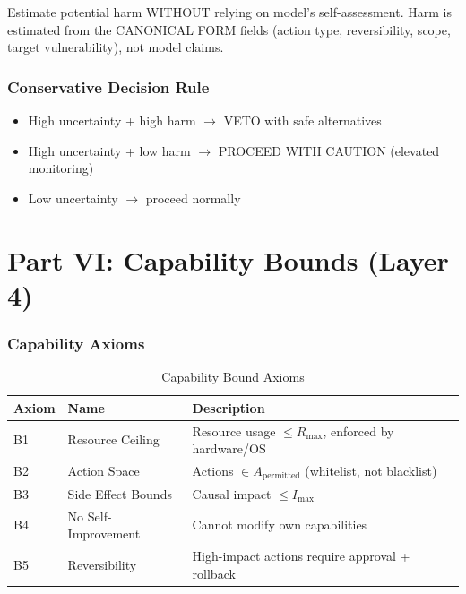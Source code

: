 \documentclass[11pt,letterpaper]{article}
\theoremstyle{definition}
\theoremstyle{remark}
\begin{document}
Estimate potential harm WITHOUT relying on model's self-assessment. Harm is estimated from the CANONICAL FORM fields (action type, reversibility, scope, target vulnerability), not model claims.

\section{Conservative Decision Rule}

\begin{itemize}
\item High uncertainty + high harm $\to$ VETO with safe alternatives
\item High uncertainty + low harm $\to$ PROCEED WITH CAUTION (elevated monitoring)
\item Low uncertainty $\to$ proceed normally
\end{itemize}



\part*{Part VI: Capability Bounds (Layer 4)}

\section{Capability Axioms}

\begin{table}[h]
\centering
\begin{tabular}{@{}lll@{}}
\toprule
\textbf{Axiom} & \textbf{Name} & \textbf{Description} \\
\midrule
B1 & Resource Ceiling & Resource usage $\leq R_{\max}$, enforced by hardware/OS \\
B2 & Action Space & Actions $\in A_{\text{permitted}}$ (whitelist, not blacklist) \\
B3 & Side Effect Bounds & Causal impact $\leq I_{\max}$ \\
B4 & No Self-Improvement & Cannot modify own capabilities \\
B5 & Reversibility & High-impact actions require approval + rollback \\
\bottomrule
\end{tabular}
\caption{Capability Bound Axioms}
\end{table}
\end{document}

